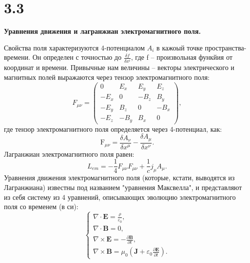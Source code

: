 \documentclass[a4paper,14pt]{article}
\begin{document}
\section*{3.3}
\begin{center}
	\LARGE{\textbf{Уравнения движения и лагранжиан электромагнитного поля.}}
\end{center}

Свойства поля характеризуются 4-потенциалом $A_i$ в кажоый точке пространства-времени. Он определен с точностью до $\frac{\delta f}{\delta x^i}$, где f -- произвольная функйия от координат и времени. Привычные нам величины -- векторы электрического и магнитных полей выражаются через тензор электромагнитного поля:
\begin{equation*}
	F_{\mu \nu} = \begin{pmatrix}
		0 & E_x & E_y & E_z \\
		-E_x & 0 & -B_z & B_y \\
		-E_y & B_z & 0 & -B_x \\
		-E_z & -B_y & B_x & 0
	\end{pmatrix},
\end{equation*}
где тензор электромагнитного поля определяется через 4-потенциал, как:
\begin{equation*}
	\mathrm{F}_{\mu \nu} = \frac{\delta A_\nu}{\delta x^\mu} - \frac{\delta A_\mu}{\delta x^\nu}.
\end{equation*}
Лагранжиан электромагнитного поля равен:
\begin{equation*}
	L_{em} = -\frac{1}{4}F_{\mu \nu}F_{\mu \nu} + \frac{1}{c}j_\mu A_\mu.
\end{equation*}
Уравнения движения электромагнитного поля (которые, кстати, выводятся из Лагранжиана) известны под названием "уравнения Максвелла", и представляют из себя систему из 4 уравнений, описывающих эволюцию электромагнитного поля со временем (в си):
\begin{equation*}
	\begin{cases}
		\nabla \cdot \mathbf{E} = \frac {\rho} {\varepsilon_0},\\
		\nabla \cdot \mathbf{B} = 0,\\
		\nabla \times \mathbf{E} = -\frac{\partial \mathbf{B}} {\partial t},\\
		\nabla \times \mathbf{B} = \mu_0\left(\mathbf{J} + \varepsilon_0 \frac{\partial \mathbf{E}} {\partial t} \right).
	\end{cases}
\end{equation*}
\end{document}
